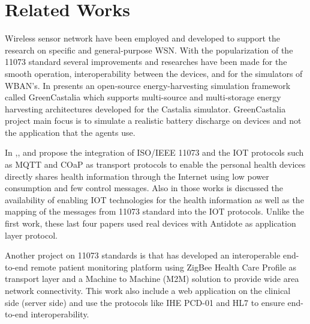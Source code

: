 \section{Related Works}

Wireless sensor network have been employed and developed to support the research on specific and general-purpose WSN. 
With the popularization of the 11073 standard several improvements and researches have been made for the smooth operation, interoperability between the devices, and for the simulators of WBAN's.
In \cite{b6} presents an open-source energy-harvesting simulation framework called GreenCastalia which supports multi-source and multi-storage energy harvesting architectures developed for the Castalia simulator. GreenCastalia project main focus is to simulate a realistic battery discharge on devices and not the application that the agents use. 

In \cite{b7},\cite{b8},\cite{b9} and \cite{b10}  propose the integration of ISO/IEEE 11073 and the IOT protocols such as MQTT and COaP as transport protocols to enable the personal health devices directly shares health information through the Internet using low power consumption and few control messages. Also in those works is discussed the availability of enabling IOT technologies for the health information as well as the mapping of the messages from 11073 standard into the IOT protocols. Unlike the first work, these last four papers used real devices with Antidote as application layer protocol.

Another project on 11073 standards is \cite{b11} that has developed an interoperable  end-to-end remote patient monitoring platform using ZigBee Health Care Profile as transport layer and a Machine to Machine (M2M) solution to provide wide area network connectivity. This work also include a web application on the clinical side (server side) and use the protocols like  IHE PCD-01 and HL7 to ensure end-to-end interoperability.

